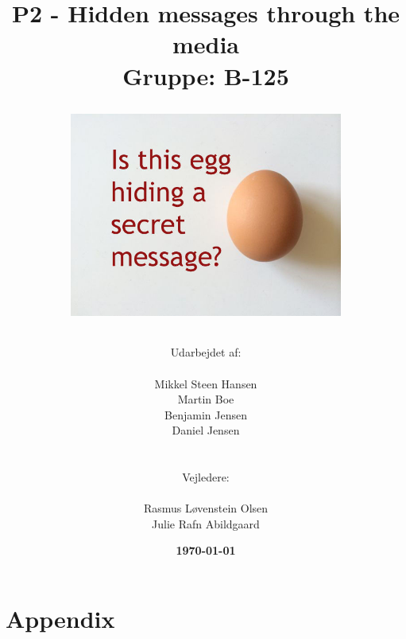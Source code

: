 \documentclass[11pt]{article}
\title{
    P2 - Hidden messages through the media 
    \\ 
    Gruppe: B-125
    \\
    \begin{figure}[!h]
        \centering
        \includegraphics[width=0.8\textwidth, angle =0]{Projectdoc/Egg-Message.jpg}
        \label{fig:FrontPage}
    \end{figure}
}
\author{
    Udarbejdet af:\\
    \\
    Mikkel Steen Hansen\\
    Martin Boe\\
    Benjamin Jensen\\
    Daniel Jensen\\
    \\\\
    Vejledere:\\ 
    \\
    Rasmus Løvenstein Olsen\\
    Julie Rafn Abildgaard\\
}
\date{\textbf{\today}}
\renewcommand{\baselinestretch}{1.20}
\begin{document}
    \begin{titlepage}
        \clearpage
        \maketitle
        \thispagestyle{empty}
    \end{titlepage}
    
    
    
    \renewcommand{\baselinestretch}{0.8} 
    \tableofcontents
    \renewcommand{\baselinestretch}{1.20} 
    \newpage
    
    
    
    
    
    
    
    
    
    
    
    
    \newpage
    
    
    
    
    
    
    \newpage
    
    
    
    \newpage
    \section{Appendix}
    
\end{document}
